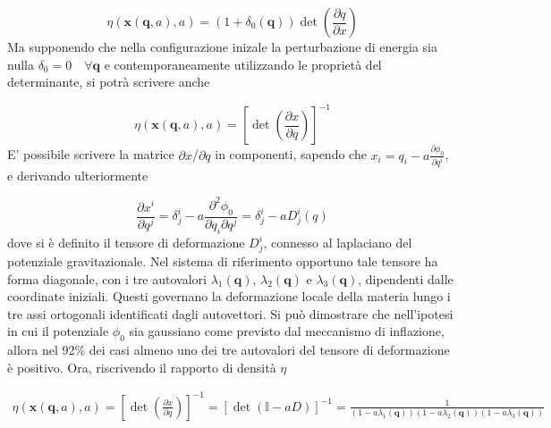 \begin{equation}
    \eta(\bm{x}(\bm{q}, a), a) = (1 + \delta_0(\bm{q}))\det\left(\frac{\partial q}{\partial x}\right) 
\end{equation}
Ma supponendo che nella configurazione inizale la perturbazione di energia sia nulla $\delta_0 = 0 \quad \forall \bm{q}$
e contemporaneamente utilizzando le proprietà del determinante, si potrà scrivere anche

\begin{equation}
    \eta(\bm{x}(\bm{q}, a), a) = \left[\det\left(\frac{\partial x}{\partial q}\right)\right]^{-1}
\end{equation}
E' possibile scrivere la matrice $\partial x$/$\partial q$ in componenti, sapendo che $x_i = q_i - a \frac{\partial\phi_0}{\partial q^i}$, 
e derivando ulteriormente 

\begin{equation}
    \frac{\partial x^i}{\partial q^j} = \delta^i_j - a \frac{\partial^2 \phi_0}{\partial q_i \partial q^j} = 
    \delta^i_j - a D^i_j(q)
\end{equation}
dove si è definito il tensore di deformazione $D^i_j$, connesso al laplaciano del potenziale gravitazionale. 
Nel sistema di riferimento opportuno tale tensore ha forma
diagonale, con i tre autovalori $\lambda_1(\bm{q})$, $\lambda_2(\bm{q})$ e $\lambda_3(\bm{q})$, dipendenti dalle
coordinate iniziali. Questi governano la deformazione locale della materia lungo i tre assi ortogonali identificati
dagli autovettori. Si può dimostrare che nell'ipotesi in cui il potenziale $\phi_0$ sia gaussiano come previsto
dal meccanismo di inflazione, allora nel 92$\%$ dei casi almeno uno dei tre autovalori del tensore di deformazione è positivo.
Ora, riscrivendo il rapporto di densità $\eta$

\begin{multline}
    \eta(\bm{x}(\bm{q}, a), a) = \left[\det\left(\frac{\partial x}{\partial q}\right)\right]^{-1} = \left[\det\left( \mathbb{I}- a D \right)\right]^{-1}
    = \frac{1}{(1-a\lambda_1(\bm{q}))(1-a\lambda_2(\bm{q}))(1-a\lambda_3(\bm{q}))}
\end{multline}

